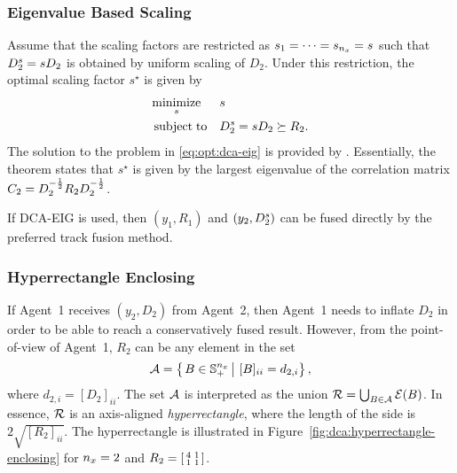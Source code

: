 \subsubsection{Eigenvalue Based Scaling}

Assume that the scaling factors are restricted as $s_1=\dots=s_{n_x}=s$ such that $D^s_2=sD_2$ is obtained by uniform scaling of $D_2$. Under this restriction, the optimal scaling factor $s^\star$ is given by
\begin{equation} \label{eq:opt:dca-eig}
\begin{aligned}
	& \underset{s}{\operatorname*{\rm minimize}} & & s \\
	& \mathop{\rm subject\; to} & & D^s_2 = sD_2 \succeq R_2.
\end{aligned}	
\end{equation}
The solution to the problem in \eqref{eq:opt:dca-eig} is provided by \cite[Theorem~3.10]{Forsling2023Phd}. Essentially, the theorem states that $s^\star$ is given by the largest eigenvalue of the correlation matrix $C_2=D_2^{-\frac{1}{2}} R_2D_2^{-\frac{1}{2}}$.

If DCA-EIG is used, then $(y_1,R_1)$ and $(y_2,D^s_2)$ can be fused directly by the preferred track fusion method.





\subsubsection{Hyperrectangle Enclosing}

If Agent~1 receives $(y_2,D_2)$ from Agent~2, then Agent~1 needs to inflate $D_2$ in order to be able to reach a conservatively fused result. However, from the point-of-view of Agent~1, $R_2$ can be any element in the set
\begin{equation}
	\mathcal{A} = \left\{ \left. B \in \mathbb{S}_{+}^{n_x} \,\right\vert\, [B]_{ii} = d_{2,i} \right\},
	\label{eq:set:dca-hyp}
\end{equation}
where $d_{2,i}=[D_2]_{ii}$. The set $\mathcal{A}$ is interpreted as the union $\mathcal{R}=\bigcup_{B\in\mathcal{A}}\mathcal{E}(B)$. In essence, $\mathcal{R}$ is an axis-aligned \emph{hyperrectangle}, where the length of the \ith side is $2\sqrt{[R_2]_{ii}}$. The hyperrectangle is illustrated in Figure~\ref{fig:dca:hyperrectangle-enclosing} for $n_x=2$ and $R_2=\left[\begin{smallmatrix}4&1\\1&1\end{smallmatrix}\right]$. 

